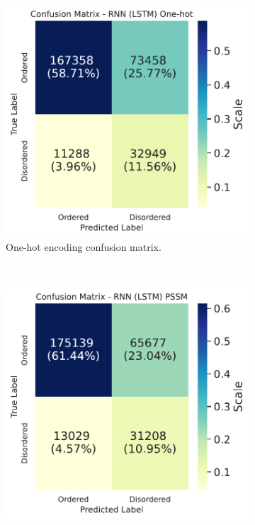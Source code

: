 \documentclass{l4proj}
\begin{document}
\begin{figure}[!htb] 
    \centering
    \begin{subfigure}[b]{0.48\textwidth}
        \includegraphics[width=\textwidth]{images/confmats/RNN1hot-cf.pdf}
        \caption{One-hot encoding confusion matrix.}
        \label{fig:cfrnn1hot}
    \end{subfigure}
    ~
    \begin{subfigure}[b]{0.48\textwidth}
        \includegraphics[width=\textwidth]{images/confmats/RNNpssm-cf.pdf}

\end{subfigure}
\end{figure}
\end{document}
